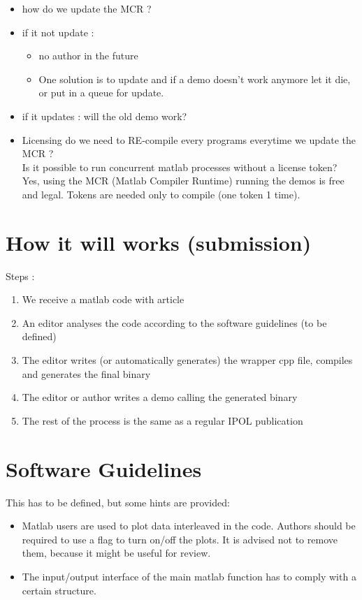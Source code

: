\begin{itemize}
\item how do we update the MCR ?
\item if it not update :
\begin{itemize}
\item no author in the future
\item One solution is to update and if a demo doesn't work anymore let it die, or put in a queue for update.
\end{itemize}
\item if it updates :  will the old demo work?
\item Licensing do we need to RE-compile every programs everytime we update the MCR ? \\
Is it possible to run concurrent matlab processes without a license token?
Yes, using the MCR (Matlab Compiler Runtime) running the demos is free and legal. Tokens are needed only to compile (one token 1 time).
\end{itemize}

\section{How it will works (submission)}

Steps : 
\begin{enumerate}
\item We receive a matlab code with article 
\item An editor analyses the code according to the software guidelines (to be defined)
\item The editor writes (or automatically generates) the wrapper cpp file, compiles and generates the final binary
\item The editor or author writes a demo calling the generated binary
\item The rest of the process is the same as a regular IPOL publication
\end{enumerate}



\section{Software Guidelines}

This has to be defined, but some hints are provided:
\begin{itemize}
\item Matlab users are used to plot data interleaved in the code. Authors should be required to use a flag to turn on/off the plots. It is advised not to remove them, because it might be useful for review.
\item The input/output interface of the main matlab function has to comply with a certain structure.
\end{itemize}

